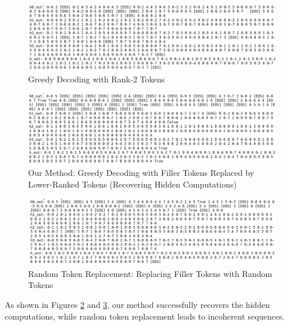 \documentclass{article}
\begin{document}
\begin{figure}[H]
    \centering
    \includegraphics[width=\textwidth]{rank2_decoding.png}
    \caption{Greedy Decoding with Rank-2 Tokens}
    \label{fig:rank2}
\end{figure}

\begin{figure}[H]
    \centering
    \includegraphics[width=\textwidth]{our_method_decoding.png}
    \caption{Our Method: Greedy Decoding with Filler Tokens Replaced by Lower-Ranked Tokens (Recovering Hidden Computations)}
    \label{fig:our-method}
\end{figure}

\begin{figure}[H]
    \centering
    \includegraphics[width=\textwidth]{random_tokens_decoding.png}
    \caption{Random Token Replacement: Replacing Filler Tokens with Random Tokens}
    \label{fig:random}
\end{figure}

As shown in Figures \ref{fig:our-method} and \ref{fig:random}, our method successfully recovers the hidden computations, while random token replacement leads to incoherent sequences.

\clearpage
\end{document}
